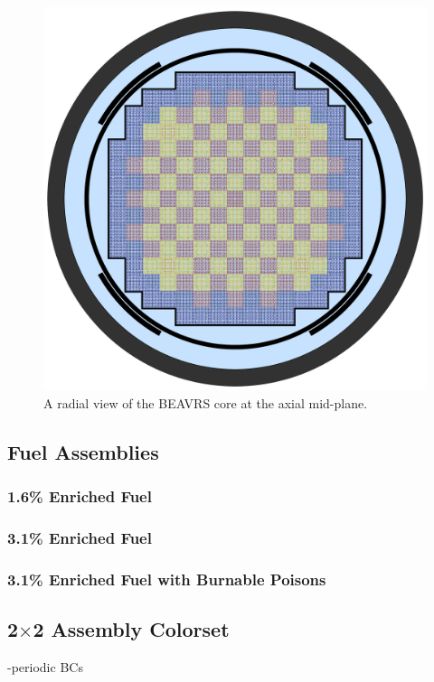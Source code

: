 \begin{figure}[h!]
  \centering
  \includegraphics[width=0.9\linewidth]{figures/benchmarks/full-core}
\caption[The \ac{BEAVRS} core at the axial mid-plane.]{A radial view of the \ac{BEAVRS} core at the axial mid-plane.}
\label{fig:chap7-full-core}
\end{figure}

\subsection{Fuel Assemblies}
\label{subsec:chap7-fuel-assms}

\subsubsection{1.6\% Enriched Fuel}

\subsubsection{3.1\% Enriched Fuel}

\subsubsection{3.1\% Enriched Fuel with Burnable Poisons}

\subsection{2$\times$2 Assembly Colorset}
-periodic BCs

